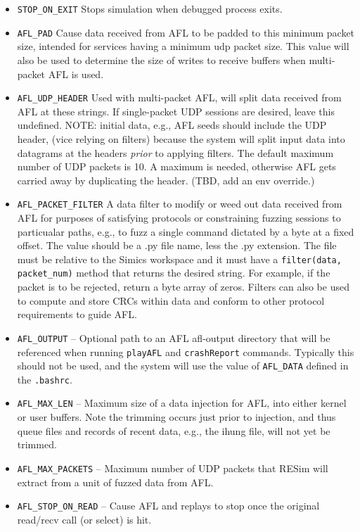 \documentclass[titlepage]{article}
\begin{document}
\begin{itemize}
\item {\tt STOP\_ON\_EXIT} Stops simulation when debugged process exits.
\item{\tt AFL\_PAD} Cause data received from AFL to be padded to this minimum packet size, intended for services having a minimum udp packet size.
This value will also be used to determine the size of writes to receive buffers when multi-packet AFL is used.
\item{\tt AFL\_UDP\_HEADER} Used with multi-packet AFL, will split data received from AFL at these strings.  If single-packet UDP sessions are desired,
leave this undefined. NOTE: initial data, e.g., AFL seeds should include the UDP header, (vice relying on filters) because the system will split input data into datagrams at the
headers \textit{prior} to applying filters.  The default maximum number of UDP packets is 10.  A maximum is needed, otherwise AFL gets carried away by duplicating
the header.  (TBD, add an env override.)
\item{\tt AFL\_PACKET\_FILTER} A data filter to modify or weed out data received from AFL for purposes of satisfying protocols or constraining fuzzing sessions to
particualar paths, e.g., to fuzz a single command dictated by a byte at a fixed offset.  The value should be a .py file name, less the
.py extension.  The file must be relative to the Simics workspace and it must have a {\tt filter(data, packet\_num)} method that returns
the desired string.  For example, if the packet is to be rejected, return a byte array of zeros.  Filters can also be used to 
compute and store CRCs within data and conform to other protocol requirements to guide AFL.  
\item {\tt AFL\_OUTPUT} -- Optional path to an AFL afl-output directory that will be referenced when running {\tt playAFL} and {\tt crashReport} commands. Typically this should not be used, and the system will use the value of {\tt AFL\_DATA} defined in the {\tt .bashrc}.
\item {\tt AFL\_MAX\_LEN} -- Maximum size of a data injection for AFL, into either kernel or user buffers. Note the trimming occurs just prior to injection,
and thus queue files and records of recent data, e.g., the ihung file, will not yet be trimmed.
\item {\tt AFL\_MAX\_PACKETS} -- Maximum number of UDP packets that RESim will extract from a unit of fuzzed data from AFL.
\item {\tt AFL\_STOP\_ON\_READ} -- Cause AFL and replays to stop once the original read/recv call (or select) is hit.

\end{itemize}
\end{document}

